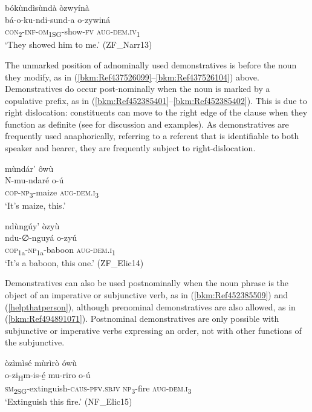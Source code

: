 \ea
\label{bkm:Ref496806997}
bókùndìsùndà òzwyínà\\
\gll bá-o-ku-ndi-sund-a  o-zywiná\\
\textsc{con}\textsubscript{2}-\textsc{inf}-\textsc{om}\textsubscript{1SG}-show-\textsc{fv}  \textsc{aug}-\textsc{dem}.\textsc{iv}\textsubscript{1}\\
\glt ‘They showed him to me.’ (ZF\_Narr13)
\z

The unmarked position of adnominally used demonstratives is before the noun they modify, as in (\ref{bkm:Ref437526099}--\ref{bkm:Ref437526104}) above. Demonstratives do occur post-nominally when the noun is marked by a copulative prefix, as in (\ref{bkm:Ref452385401}--\ref{bkm:Ref452385402}). This is due to right dislocation: constituents can move to the right edge of the clause when they function as definite (see  for discussion and examples). As demonstratives are frequently used anaphorically, referring to a referent that is identifiable to both speaker and hearer, they are frequently subject to right-dislocation.

\ea
\label{bkm:Ref452385401}
mùndár’ ôwù\\
\gll N-mu-ndaré    o-ú\\
\textsc{cop}-\textsc{np}\textsubscript{3}-maize  \textsc{aug}-\textsc{dem}.\textsc{i}\textsubscript{3}\\
\glt ‘It’s maize, this.’
\z

\ea
\label{bkm:Ref452385402}
ndùngúy’ òzyù\\
\gll ndu-∅-nguyá  o-zyú\\
\textsc{cop}\textsubscript{1a}-\textsc{np}\textsubscript{1a}-baboon  \textsc{aug}-\textsc{dem}.\textsc{i}\textsubscript{1}\\
\glt ‘It’s a baboon, this one.’ (ZF\_Elic14)
\z

Demonstratives can also be used postnominally when the noun phrase is the object of an imperative or subjunctive verb, as in (\ref{bkm:Ref452385509}) and (\ref{helpthatperson}), although prenominal demonstratives are also allowed, as in (\ref{bkm:Ref494891071}). Postnominal demonstratives are only possible with subjunctive or imperative verbs expressing an order, not with other functions of the subjunctive.

\ea
\label{bkm:Ref452385509}
òzìmìsé mùrìrò ówù\\
\gll o-zi\textsubscript{H}m-is-é̲        mu-riro  o-ú\\
\textsc{sm}\textsubscript{2SG}-extinguish-\textsc{caus}-\textsc{pfv}.\textsc{sbjv}  \textsc{np}\textsubscript{3}-fire  \textsc{aug}-\textsc{dem}.\textsc{i}\textsubscript{3}\\
\glt ‘Extinguish this fire.’ (NF\_Elic15)
\z

